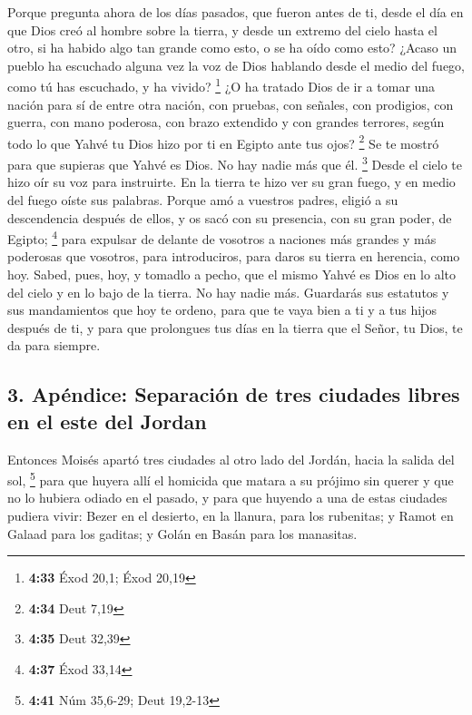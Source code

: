  Porque pregunta ahora de los días pasados, que fueron
antes de ti, desde el día en que Dios creó al hombre sobre la tierra, y
desde un extremo del cielo hasta el otro, si ha habido algo tan grande
como esto, o se ha oído como esto?  ¿Acaso un pueblo ha
escuchado alguna vez la voz de Dios hablando desde el medio del fuego,
como tú has escuchado, y ha vivido? \footnote{\textbf{4:33} Éxod 20,1;
  Éxod 20,19}  ¿O ha tratado Dios de ir a tomar una
nación para sí de entre otra nación, con pruebas, con señales, con
prodigios, con guerra, con mano poderosa, con brazo extendido y con
grandes terrores, según todo lo que Yahvé tu Dios hizo por ti en Egipto
ante tus ojos? \footnote{\textbf{4:34} Deut 7,19}  Se te
mostró para que supieras que Yahvé es Dios. No hay nadie más que él.
\footnote{\textbf{4:35} Deut 32,39}  Desde el cielo te
hizo oír su voz para instruirte. En la tierra te hizo ver su gran fuego,
y en medio del fuego oíste sus palabras.  Porque amó a
vuestros padres, eligió a su descendencia después de ellos, y os sacó
con su presencia, con su gran poder, de Egipto; \footnote{\textbf{4:37}
  Éxod 33,14}  para expulsar de delante de vosotros a
naciones más grandes y más poderosas que vosotros, para introduciros,
para daros su tierra en herencia, como hoy.  Sabed, pues,
hoy, y tomadlo a pecho, que el mismo Yahvé es Dios en lo alto del cielo
y en lo bajo de la tierra. No hay nadie más.  Guardarás
sus estatutos y sus mandamientos que hoy te ordeno, para que te vaya
bien a ti y a tus hijos después de ti, y para que prolongues tus días en
la tierra que el Señor, tu Dios, te da para siempre.

\hypertarget{apuxe9ndice-separaciuxf3n-de-tres-ciudades-libres-en-el-este-del-jordan}{%
\subsection{3. Apéndice: Separación de tres ciudades libres en el este
del
Jordan}\label{apuxe9ndice-separaciuxf3n-de-tres-ciudades-libres-en-el-este-del-jordan}}

 Entonces Moisés apartó tres ciudades al otro lado del
Jordán, hacia la salida del sol, \footnote{\textbf{4:41} Núm 35,6-29;
  Deut 19,2-13}  para que huyera allí el homicida que
matara a su prójimo sin querer y que no lo hubiera odiado en el pasado,
y para que huyendo a una de estas ciudades pudiera vivir:
 Bezer en el desierto, en la llanura, para los rubenitas;
y Ramot en Galaad para los gaditas; y Golán en Basán para los manasitas.


